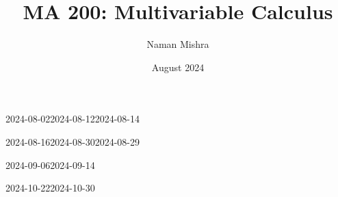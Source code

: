\documentclass[12pt]{report}
\title{MA 200: Multivariable Calculus}
\author{Naman Mishra}
\date{August 2024}
\begin{document}
\maketitle
\tableofcontents
\newpage
\listoflecture
\listofhw
    
    
    
    
    \small{}
        {2024-08-02}{2024-08-12}{2024-08-14}\normalsize
    
    
    
    
    
    
    \small{}
        {2024-08-16}{2024-08-30}{2024-08-29}\normalsize
    
    
    
    
    
    
    \small{}
        {2024-09-06}{2024-09-14}{}\normalsize
    
    
    
    
    
    
    
    \small{}
        {2024-10-22}{2024-10-30}{}\normalsize
    
    
    
    
    
    
    
    
\end{document}
